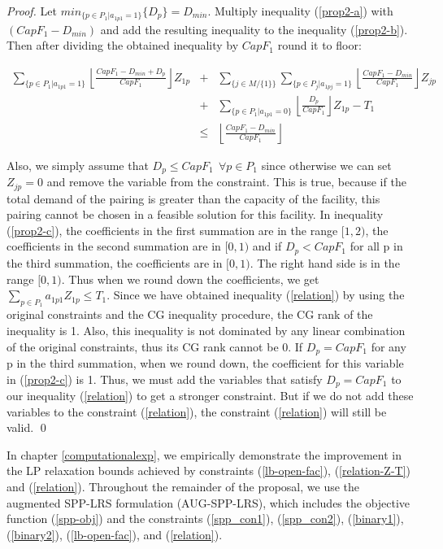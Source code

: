 \begin{proof}
Let $min_{\{p \in P_1 | a_{1p1}=1\}} \{ D_p \}=D_{min}$. Multiply inequality (\ref{prop2-a}) 
with $(CapF_1-D_{min})$ and add the resulting inequality to the inequality (\ref{prop2-b}). 
Then after dividing the obtained inequality by $CapF_1$ round it to floor: 

\begin{eqnarray}
 \sum_{\{p \in P_1 | a_{1p1}=1\}}  \left \lfloor \frac{CapF_1-D_{min}+D_p}{CapF_1} \right \rfloor Z_{1p} &+&
    \sum_{\{j \in M / \{1\}\}}\sum_{\{p \in P_{j}|a_{1pj}=1\}}\left \lfloor \frac{CapF_1-D_{min}}{CapF_1}\right \rfloor Z_{jp}\nonumber \\
     &+&\sum_{\{p \in P_1 | a_{1p1}=0\}}\left \lfloor \frac{D_p}{CapF_1}\right \rfloor Z_{1p} - T_1\nonumber \\
&\leq&  \left \lfloor \frac {CapF_1-D_{min}}{CapF_1}\right \rfloor  \label{prop2-c}
\end{eqnarray} 


Also, we simply assume that $D_p \leq CapF_1 \ \ \forall p \in P_1$ since otherwise we can set
$Z_{jp}=0$ and remove the variable from the constraint. This is true, because if the
total demand of the pairing is greater than the capacity of the facility, this pairing
cannot be chosen in a feasible solution for this facility. In inequality (\ref{prop2-c}), 
the coefficients in the first summation are in the range $[1,2)$, the coefficients in the second 
summation are in $[0,1)$ and if $D_p<CapF_1$ for all p in the third summation, the coefficients are in 
$[0,1)$. The right hand side is in the range $[0,1)$. Thus when we round down the coefficients, we get 
$\sum_{p \in P_1} a_{1p1} Z_{1p} \leq T_1$. Since we have obtained inequality (\ref{relation}) by using
the original constraints and the CG inequality procedure, the CG rank of the inequality is 1. Also, 
this inequality is not dominated by any linear combination of the original constraints, thus
its CG rank cannot be 0. If $D_p=CapF_1$ for any p in the third summation, when we round down, 
the coefficient for this variable in (\ref{prop2-c}) is 1. Thus, we must add the variables that 
satisfy $D_p=CapF_1$ to our inequality (\ref{relation}) to get a stronger constraint. But if we do not add these 
variables to the constraint (\ref{relation}), the constraint (\ref{relation}) will still be valid. 
\qed
\end{proof}

In chapter \ref{computationalexp}, we empirically demonstrate the improvement in the LP relaxation 
bounds achieved by constraints (\ref{lb-open-fac}), (\ref{relation-Z-T}) and (\ref{relation}). 
Throughout the remainder of the proposal, we use the augmented SPP-LRS formulation (AUG-SPP-LRS),
which includes the objective function (\ref{spp-obj}) and the constraints (\ref{spp_con1}), 
(\ref{spp_con2}), (\ref{binary1}), (\ref{binary2}), (\ref{lb-open-fac}), and (\ref{relation}). 


